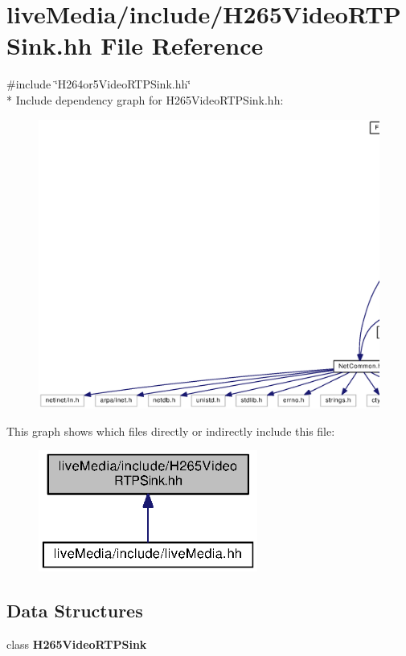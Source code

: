 \section{live\+Media/include/\+H265\+Video\+R\+T\+P\+Sink.hh File Reference}
\label{H265VideoRTPSink_8hh}
{\ttfamily \#include \char`\"{}H264or5\+Video\+R\+T\+P\+Sink.\+hh\char`\"{}}\\*
Include dependency graph for H265\+Video\+R\+T\+P\+Sink.\+hh\+:
\nopagebreak
\begin{figure}[H]
\begin{center}
\leavevmode
\includegraphics[width=350pt]{H265VideoRTPSink_8hh__incl}
\end{center}
\end{figure}
This graph shows which files directly or indirectly include this file\+:
\nopagebreak
\begin{figure}[H]
\begin{center}
\leavevmode
\includegraphics[width=204pt]{H265VideoRTPSink_8hh__dep__incl}
\end{center}
\end{figure}
\subsection*{Data Structures}
\begin{DoxyCompactItemize}
\item 
class {\bf H265\+Video\+R\+T\+P\+Sink}
\end{DoxyCompactItemize}
